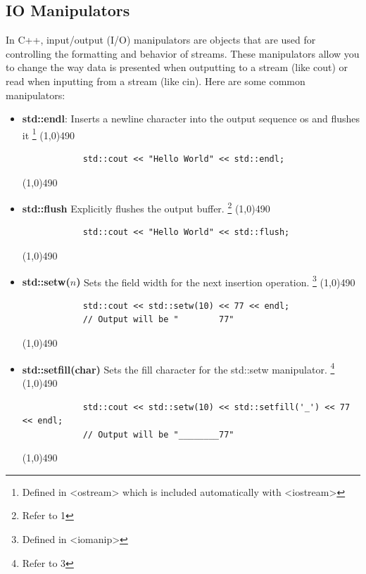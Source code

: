 \documentclass{report}
\begin{document}
    \pagebreak \bigbreak \noindent 
    \subsection{IO Manipulators}
    \bigbreak \noindent 
    In C++, input/output (I/O) manipulators are objects that are used for controlling the formatting and behavior of streams. These manipulators allow you to change the way data is presented when outputting to a stream (like cout) or read when inputting from a stream (like cin).
    \bigbreak \noindent 
    Here are some common manipulators:
    \begin{itemize}
        \item \textbf{std::endl}:  Inserts a newline character into the output sequence os and flushes it \footnote{Defined in <ostream> which is included automatically with <iostream>}
            \smallbreak
            \line(1,0){490}
            \begin{verbatim}
            std::cout << "Hello World" << std::endl;
            \end{verbatim}
            \line(1,0){490}
        \item \textbf{std::flush}  Explicitly flushes the output buffer. \footnote{Refer to 1}
            \smallbreak
            \line(1,0){490}
            \begin{verbatim}
            std::cout << "Hello World" << std::flush;
            \end{verbatim}
            \line(1,0){490}
        \item \textbf{std::setw($n$)} Sets the field width for the next insertion operation. \footnote{Defined in <iomanip>}
            \smallbreak
            \line(1,0){490}
            \begin{verbatim}
            std::cout << std::setw(10) << 77 << endl; 
            // Output will be "        77"
            \end{verbatim}
            \line(1,0){490}
        \item \textbf{std::setfill(char)} Sets the fill character for the std::setw manipulator. \footnote{Refer to 3}
            \smallbreak
            \line(1,0){490}
            \begin{verbatim}
            std::cout << std::setw(10) << std::setfill('_') << 77 << endl; 
            // Output will be "________77"
            \end{verbatim}
            \line(1,0){490}


\end{itemize}
\end{document}
